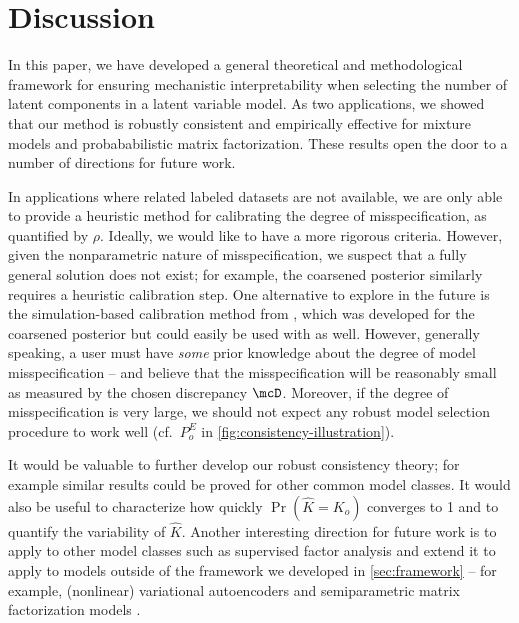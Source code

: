 \section{Discussion} \label{sec:discussion}

In this paper, we have developed a general theoretical and methodological framework for ensuring 
mechanistic interpretability when selecting the number of latent components in a latent variable model. 
As two applications, we showed that our \methodname method is robustly consistent and empirically 
effective for mixture models and probababilistic matrix factorization. 
These results open the door to a number of directions for future work.

In applications where related labeled datasets are not available, we are only able to provide a heuristic method for calibrating the degree of misspecification, as quantified by $\rho$.
Ideally, we would like to have a more rigorous criteria.
However, given the nonparametric nature of misspecification, we suspect that a fully general solution does not exist; for example, the coarsened posterior similarly requires a heuristic calibration step.
One alternative to explore in the future is the simulation-based calibration method from \citet{Xue:2024}, which was developed for the coarsened posterior but could easily be used with \methodname as well.
However, generally speaking, a user must have \emph{some} prior knowledge about the degree of model misspecification -- and believe that the misspecification will be reasonably small as measured by the chosen discrepancy $\mcD$.
Moreover, if the degree of misspecification is very large, we should not expect any robust model selection procedure to
work well (cf.\ $P_{o}^{E}$ in \cref{fig:consistency-illustration}).

It would be valuable to further develop our robust consistency theory; for example  
similar results could be proved for other common model classes. 
It would also be useful to characterize how quickly $\Pr(\widehat{K} = K_o)$ converges to 1 
and to quantify the variability of $\widehat{K}$.
Another interesting direction for future work is to apply \methodname to other model classes such as supervised factor analysis and extend it to apply to models outside of the framework we developed in
\cref{sec:framework} -- for example, (nonlinear) variational autoencoders \citep{Kingma2014,Kingma2019VAEs} and semiparametric matrix factorization models \citep{Anandkumar2014uc,rohe2023vintage-7f4}.


